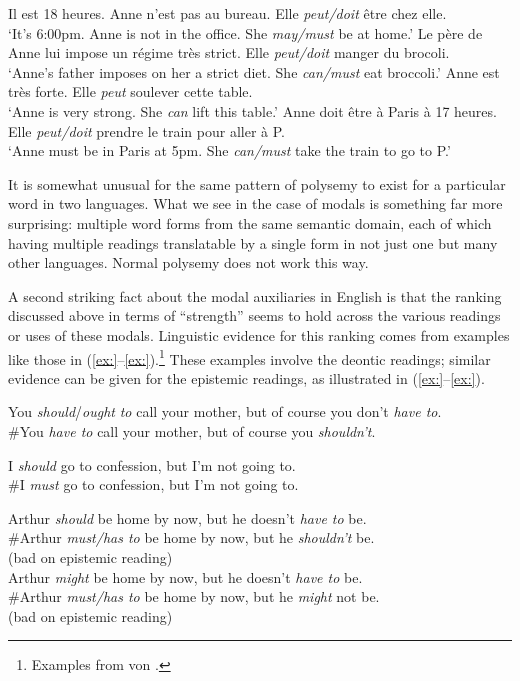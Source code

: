 \ea
\ea  Il est 18 heures. Anne n’est pas au bureau. Elle \textit{peut/doit} être chez elle.\\
\glt ‘It’s 6:00pm. Anne is not in the office. She \textit{may/must} be at home.’
\ex   Le père de Anne lui impose un régime très strict. Elle \textit{peut/doit} manger du brocoli.\\
\glt ‘Anne’s father imposes on her a strict diet. She \textit{can/must} eat broccoli.’
\ex Anne est très forte. Elle \textit{peut} soulever cette table.\\
\glt ‘Anne is very strong. She \textit{can} lift this table.’
\ex  Anne doit être à Paris à 17 heures. Elle \textit{peut/doit} prendre le train pour aller à P.\\
\glt ‘Anne must be in Paris at 5pm. She \textit{can/must} take the train to go to P.’
\z \z


It is somewhat unusual for the same pattern of polysemy to exist for a particular word in two languages. What we see in the case of modals is something far more surprising: multiple word forms from the same semantic domain, each of which having multiple readings translatable by a single form in not just one but many other languages. Normal polysemy does not work this way.



A second striking fact about the modal auxiliaries in English is that the ranking discussed above in terms of “strength” seems to hold across the various readings or uses of these modals. Linguistic evidence for this ranking comes from examples like those in (\ref{ex:}--\ref{ex:}).\footnote{Examples from von \citet{Fintel2006}.} These examples involve the deontic readings; similar evidence can be given for the epistemic readings, as illustrated in (\ref{ex:}--\ref{ex:}).


\ea
\ea You \textit{should}/\textit{ought} \textit{to} call your mother, but of course you don’t \textit{have to}.\\
\ex \#You \textit{have to} call your mother, but of course you \textit{shouldn’t}.
\z \z

\ea
\ea I \textit{should} go to confession, but I’m not going to.\\
\ex \#I \textit{must} go to confession, but I’m not going to.
                       \z
\z

\ea
\ea Arthur \textit{should} be home by now, but he doesn’t \textit{have to} be.\\
\ex \#Arthur \textit{must/has to} be home by now, but he \textit{shouldn’t} be.\\
  (bad on epistemic reading)\\
\ex Arthur \textit{might} be home by now, but he doesn’t \textit{have to} be.\\
\ex \#Arthur \textit{must/has to} be home by now, but he \textit{might} not be.\\
  (bad on epistemic reading)
                       \z
\z

